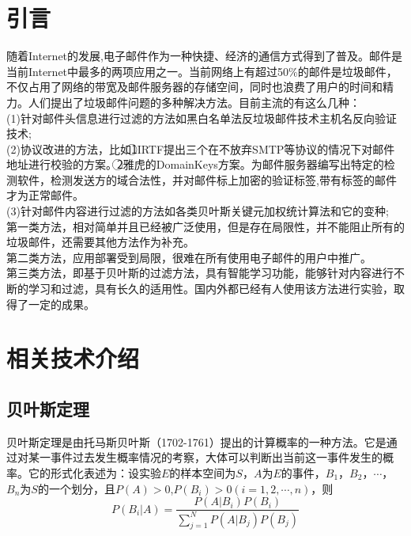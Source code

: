 \documentclass[a4paper,11pt,onecolumn,twoside]{article}
\begin{document}

\setlength{\oddsidemargin}{-.5cm}  %
\setlength{\evensidemargin}{\oddsidemargin}
\setlength{\textwidth}{17.00cm}

\begin{multicols}{2}
\section{引言}
随着Internet的发展,电子邮件作为一种快捷、经济的通信方式得到了普及。邮件是当前Internet中最多的两项应用之一\cite{Liu}。当前网络上有超过50\%的邮件是垃圾邮件，不仅占用了网络的带宽及邮件服务器的存储空间，同时也浪费了用户的时间和精力。人们提出了垃圾邮件问题的多种解决方法。目前主流的有这么几种：\\
\indent(1)针对邮件头信息进行过滤的方法如黑白名单法反垃圾邮件技术主机名反向验证技术;\\
\indent(2)协议改进的方法，比如\textcircled{1}IRTF提出三个在不放弃SMTP等协议的情况下对邮件地址进行校验的方案。\textcircled{2}雅虎的DomainKeys方案。为邮件服务器编写出特定的检测软件，检测发送方的域合法性，并对邮件标上加密的验证标签,带有标签的邮件才为正常邮件。\\
\indent(3)针对邮件内容进行过滤的方法如各类贝叶斯关键元加权统计算法和它的变种;\\
\indent 第一类方法，相对简单并且已经被广泛使用，但是存在局限性，并不能阻止所有的垃圾邮件，还需要其他方法作为补充。\\
\indent 第二类方法，应用部署受到局限，很难在所有使用电子邮件的用户中推广。\\
\indent 第三类方法，即基于贝叶斯的过滤方法，具有智能学习功能，能够针对内容进行不断的学习和过滤，具有长久的适用性。国内外都已经有人使用该方法进行实验，取得了一定的成果\cite{Zhang}。\\
\section{相关技术介绍}

\subsection{贝叶斯定理}
贝叶斯定理是由托马斯贝叶斯（1702-1761）提出的计算概率的一种方法。它是通过对某一事件过去发生概率情况的考察，大体可以判断出当前这一事件发生的概率。它的形式化表述为：设实验$E$的样本空间为$S$，$A$为$E$的事件，$B_1$，$B_2$，$\cdots$，$B_n$为$S$的一个划分，且$P(A)>0$,$P(B_i)>0(i=1,2,\cdots,n)$，则
\begin{equation}
P(B_i|A)=\frac{P(A|B_i)P(B_i)}{\sum_{j=1}^NP(A|B_j)P(B_j)}
\end{equation}

\end{multicols}
\end{document}
